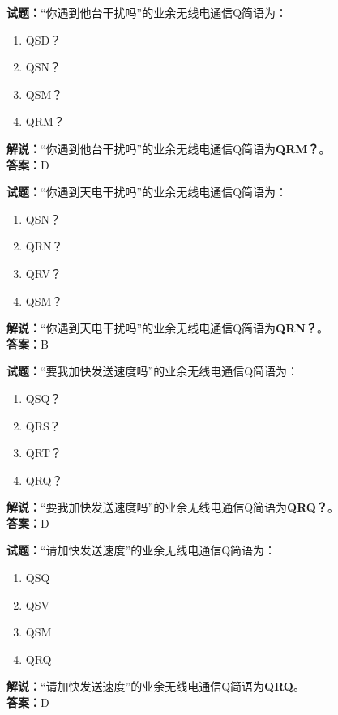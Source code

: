 \documentclass{ctexbook}
\begin{document}
\vspace{1em}

\textbf{试题：}“你遇到他台干扰吗”的业余无线电通信Q简语为：
\begin{enumerate}[leftmargin=3em]
  \item QSD？
  \item QSN？
  \item QSM？
  \item QRM？
\end{enumerate}
\noindent\textbf{解说：}“你遇到他台干扰吗”的业余无线电通信Q简语为\textbf{QRM？}。\\\noindent\textbf{答案：}D

\vspace{1em}

\textbf{试题：}“你遇到天电干扰吗”的业余无线电通信Q简语为：
\begin{enumerate}[leftmargin=3em]
  \item QSN？
  \item QRN？
  \item QRV？
  \item QSM？
\end{enumerate}
\noindent\textbf{解说：}“你遇到天电干扰吗”的业余无线电通信Q简语为\textbf{QRN？}。\\\noindent\textbf{答案：}B

\vspace{1em}

\textbf{试题：}“要我加快发送速度吗”的业余无线电通信Q简语为：
\begin{enumerate}[leftmargin=3em]
  \item QSQ？
  \item QRS？
  \item QRT？
  \item QRQ？
\end{enumerate}
\noindent\textbf{解说：}“要我加快发送速度吗”的业余无线电通信Q简语为\textbf{QRQ？}。\\\noindent\textbf{答案：}D

\vspace{1em}

\textbf{试题：}“请加快发送速度”的业余无线电通信Q简语为：
\begin{enumerate}[leftmargin=3em]
  \item QSQ
  \item QSV
  \item QSM
  \item QRQ
\end{enumerate}
\noindent\textbf{解说：}“请加快发送速度”的业余无线电通信Q简语为\textbf{QRQ}。\\\noindent\textbf{答案：}D
\end{document}
